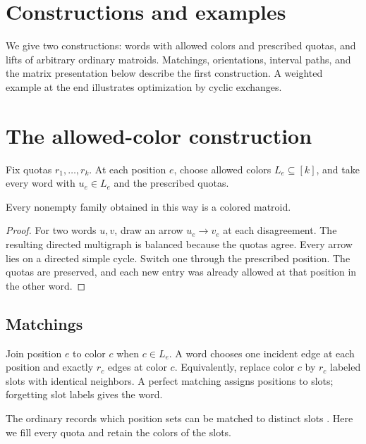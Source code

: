 
\section[constructions]{Constructions and examples}

We give two constructions: words with allowed colors and prescribed quotas,
and lifts of arbitrary ordinary matroids. Matchings, orientations, interval
paths, and the matrix presentation below describe the first construction.
A weighted example at the end illustrates optimization by cyclic exchanges.

\section[allowedColors]{The allowed-color construction}

Fix quotas $r_1,\dotsc,r_k$. At each position $e$, choose allowed colors
$L_e\subseteq[k]$, and take every word with $u_e\in L_e$ and the prescribed
quotas.

\begin{theorem}
Every nonempty family obtained in this way is a colored matroid.
\end{theorem}

\begin{proof}
For two words $u,v$, draw an arrow $u_e\to v_e$ at each disagreement.
The resulting directed multigraph is balanced because the quotas agree.
Every arrow lies on a directed simple cycle. Switch one through the
prescribed position. The quotas are preserved, and each new entry was
already allowed at that position in the other word.
\end{proof}

\subsection[matchingAssignments]{Matchings}

Join position $e$ to color $c$ when $c\in L_e$. A word chooses one
incident edge at each position and exactly $r_c$ edges at color $c$.
Equivalently, replace color $c$ by $r_c$ labeled slots with identical
neighbors. A perfect matching assigns positions to slots; forgetting slot
labels gives the word.

The ordinary  records which position sets can
be matched to distinct slots \cite{Oxley2011}. Here we fill every quota
and retain the colors of the slots.


